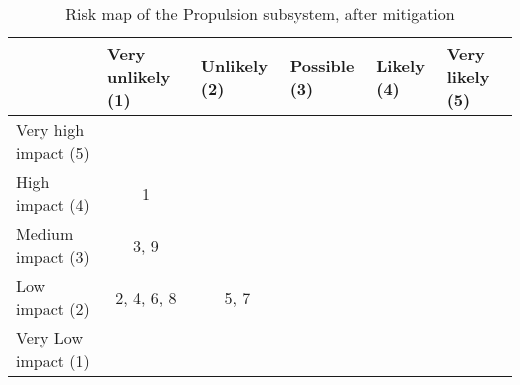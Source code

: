 \begin{table}[H]
\centering
\caption{Risk map of the Propulsion subsystem, after mitigation}
\label{tab:risk-map-prop-mitig}\begin{tabular}{l|c|c|c|c|c|}
\cline{2-6}
& \multicolumn{1}{l|}{Very unlikely (1)} & \multicolumn{1}{l|}{Unlikely (2)} & \multicolumn{1}{l|}{Possible (3)} & \multicolumn{1}{l|}{Likely (4)} & \multicolumn{1}{l|}{Very likely (5)} \\ \hline
\multicolumn{1}{|l|}{Very high impact (5)} & \cellcolor{rm-3} & \cellcolor{rm-3} & \cellcolor{rm-3} & \cellcolor{rm-3} & \cellcolor{rm-3}\\ \hline 
\multicolumn{1}{|l|}{High impact (4)} & \cellcolor{rm-2}1 & \cellcolor{rm-2} & \cellcolor{rm-2} & \cellcolor{rm-3} & \cellcolor{rm-3}\\ \hline 
\multicolumn{1}{|l|}{Medium impact (3)} & \cellcolor{rm-0}3, 9 & \cellcolor{rm-1} & \cellcolor{rm-1} & \cellcolor{rm-2} & \cellcolor{rm-3}\\ \hline 
\multicolumn{1}{|l|}{Low impact (2)} & \cellcolor{rm-0}2, 4, 6, 8 & \cellcolor{rm-0}5, 7 & \cellcolor{rm-1} & \cellcolor{rm-2} & \cellcolor{rm-3}\\ \hline 
\multicolumn{1}{|l|}{Very Low impact (1)} & \cellcolor{rm-0} & \cellcolor{rm-0} & \cellcolor{rm-0} & \cellcolor{rm-2} & \cellcolor{rm-3}\\ \hline 
\end{tabular} 
\end{table}


